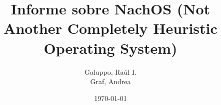 \documentclass[a4paper,11pt,oneside, openright]{utthesis} %
\title{Informe sobre NachOS (Not Another Completely Heuristic Operating System)}
\author{Galuppo, Raúl I. \\Graf, Andrea}
\date{\today}
\begin{document}
\maketitle
\newpage


\renewcommand{\contentsname}{Contenidos}
\tableofcontents %







%

\end{document}
